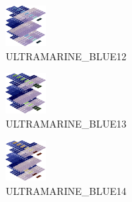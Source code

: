 \hspace{0.1cm}
\begin{minipage}[b]{0.15\linewidth}
\begin{figure}[H]                                                          
  \centering                                                             
  \begin{adjustbox}{width=1.5cm,center}                                   
  \includegraphics[width=1.5cm]{src/colorspace_colourflow/flows/colourflow_124-45.png}%
  \end{adjustbox}                                                        
\caption*{ULTRAMARINE\_BLUE12}                                           
\end{figure}                                                               
\end{minipage}
\hspace{0.1cm}
\begin{minipage}[b]{0.15\linewidth}
\begin{figure}[H]                                                          
  \centering                                                             
  \begin{adjustbox}{width=1.5cm,center}                                   
  \includegraphics[width=1.5cm]{src/colorspace_colourflow/flows/colourflow_125-45.png}%
  \end{adjustbox}                                                        
\caption*{ULTRAMARINE\_BLUE13}                                           
\end{figure}                                                               
\end{minipage}
\hspace{0.1cm}
\begin{minipage}[b]{0.15\linewidth}
\begin{figure}[H]                                                          
  \centering                                                             
  \begin{adjustbox}{width=1.5cm,center}                                   
  \includegraphics[width=1.5cm]{src/colorspace_colourflow/flows/colourflow_126-45.png}%
  \end{adjustbox}                                                        
\caption*{ULTRAMARINE\_BLUE14}                                           
\end{figure}                                                               
\end{minipage}
